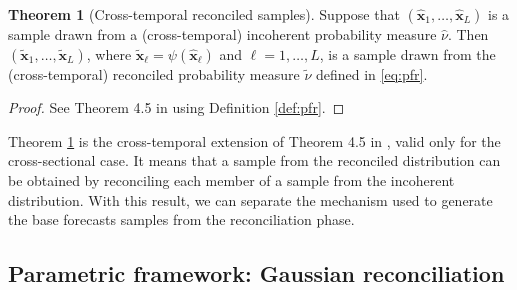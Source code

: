 \documentclass[review, 11pt]{elsarticle}
\newcommand{\xvet}{\bm{x}}
\theoremstyle{definition}
\newtheorem{theorem}{Theorem}[section]
\begin{document}
\begin{theorem}[Cross-temporal reconciled samples] \label{thm:rs}
	Suppose that $(\widehat{\xvet}_1, \dots, \widehat{\xvet}_L)$ is a sample drawn from a (cross-temporal) incoherent probability measure $\widehat{\nu}$. Then $(\widetilde{\xvet}_1, \dots, \widetilde{\xvet}_L)$, where $\widetilde{\xvet}_\ell=\psi(\widehat{\xvet}_\ell)$ and $\ell= 1, \dots, L$, is a sample drawn from the (cross-temporal) reconciled probability measure $\widetilde{\nu}$ defined in \eqref{eq:pfr}.
\end{theorem}
\begin{proof}
	See Theorem 4.5 in \cite{panagiotelis2023} using Definition \ref{def:pfr}.
\end{proof}
Theorem \ref{thm:rs} is the cross-temporal extension of Theorem 4.5 in \cite{panagiotelis2023}, valid only for the cross-sectional case. It means that a sample from the reconciled distribution can be obtained by reconciling each member of a sample from the incoherent distribution. With this result, we can separate the mechanism used to generate the base forecasts samples from the reconciliation phase.


\subsection{Parametric framework: Gaussian reconciliation}\label{ssec:prob_pf}
\end{document}
